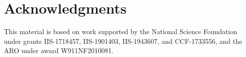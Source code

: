 \documentclass[letterpaper]{article}
\begin{document}







\section*{Acknowledgments}
This material is based on work supported by the National Science Foundation under grants IIS-1718457, IIS-1901403, IIS-1943607, and CCF-1733556, and the ARO under award W911NF2010081.





\clearpage
\onecolumn
\appendix






\end{document}
